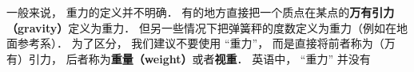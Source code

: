 

一般来说， 重力的定义并不明确． 有的地方直接把一个质点在某点的\textbf{万有引力（gravity）}定义为重力． 但另一些情况下把弹簧秤的度数定义为重力（例如在地面参考系）． 为了区分， 我们建议不要使用 “重力”， 而是直接将前者称为（万有）引力， 后者称为\textbf{重量（weight）}或者\textbf{视重}． 英语中， “重力” 并没有
